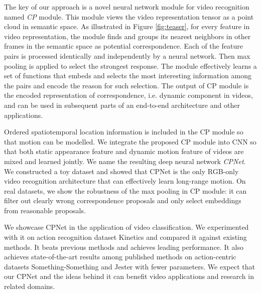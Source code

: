 \documentclass[10pt,twocolumn,letterpaper]{article}
\begin{document}
The key of our approach is a novel neural network module for video recognition named \emph{CP} module. This module views the video representation tensor as a point cloud in semantic space. As illustrated in Figure \ref{fig:teaser}, for every feature in video representation, the module finds and groups its  nearest neighbors in other frames in the semantic space as potential correspondence. Each of the  feature pairs is processed identically and independently by a neural network. Then max pooling is applied to select the strongest response.
  The module effectively learns a set of functions that embeds and selects the most interesting information among the  pairs and encode the reason for such selection. The output of CP module is the encoded representation of correspondence, i.e. dynamic component in videos, and can be used in subsequent parts of an end-to-end architecture and other applications.


Ordered spatiotemporal location information is included in the CP module so that motion can be modelled. We integrate the proposed CP module into CNN so that both static appearance feature and dynamic motion feature of videos are mixed and learned jointly. We name the resulting deep neural network \emph{CPNet}. We constructed a toy dataset and showed that CPNet is the only RGB-only video recognition architecture that can effectively learn long-range motion. On real datasets, we show the robustness of the max pooling in CP module: it can filter out clearly wrong correspondence proposals and only select embeddings from reasonable proposals. 

We showcase CPNet in the application of video classification. We experimented with it on action recognition dataset Kinetics \cite{Kinetics} and compared it against existing methods. It beats previous methods and achieves leading performance. It also achieves state-of-the-art results among published methods on action-centric datasets Something-Something \cite{Something:Something} and Jester \cite{Jester} with fewer parameters. 
We expect that our CPNet and the ideas behind it can benefit video applications and research in related domains. 
















 
\end{document}
